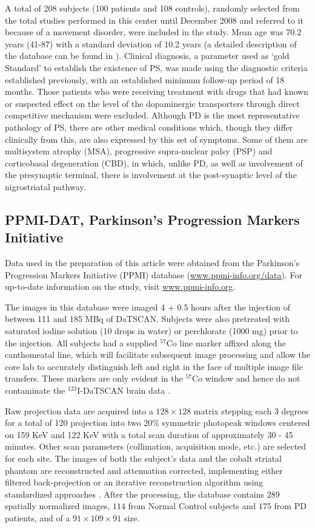 A total of 208 subjects (100 patients and 108 controls), randomly selected from the total studies performed in this center until December 2008 and referred to it because of a movement disorder, were included in the study. Mean age was 70.2 years (41-87) with a standard deviation of 10.2 years (a detailed description of the database can be found in \cite{Lozano2007}). Clinical diagnosis, a parameter used as `gold Standard' to establish the existence of PS, was made using the diagnostic criteria established previously, with an established minimum follow-up period of 18 months. Those patients who were receiving treatment with drugs that had known or suspected effect on the level of the dopaminergic transporters through direct competitive mechanism were excluded. Although PD is the most representative pathology of PS, there are other medical conditions which, though they differ clinically from this, are also expressed by this set of symptoms. Some of them are multisystem atrophy (MSA), progressive supra-nuclear palsy (PSP) and corticobasal degeneration (CBD), in which, unlike PD, as well as involvement of the presynaptic terminal, there is involvement at the post-synaptic level of the nigrostriatal pathway. 

\subsection{PPMI-DAT, Parkinson's Progression Markers Initiative}\label{sec:ppmi}
Data used in the preparation of this article were obtained from the Parkinson's Progression Markers Initiative (PPMI) database (\url{www.ppmi-info.org/data}). For up-to-date information on the study, visit \url{www.ppmi-info.org}.

The images in this database were imaged 4 + 0.5 hours after the injection of between 111 and 185 MBq of DaTSCAN. Subjects were also pretreated with saturated iodine solution (10 drops in water) or perchlorate (1000 mg) prior to the injection. All subjects had a supplied $^{57}$Co line marker affixed along the canthomeatal line, which will facilitate subsequent image processing and allow the core lab to accurately distinguish left and right in the face of multiple image file transfers. These markers are only evident in the $^{57}$Co window and hence do not contaminate the $^{123}$I-DaTSCAN brain data \cite{PPMI,Inititative2010}. 

Raw projection data are acquired into a $128 \times 128$ matrix stepping each 3 degrees for a total of 120 projection into two 20\% symmetric photopeak windows centered on 159 KeV and 122 KeV with a total scan duration of approximately 30 - 45 minutes. Other scan parameters (collimation, acquisition mode, etc.) are selected for each site. The images of both the subject's data and the cobalt striatal phantom are reconstructed and attenuation corrected, implementing either filtered back-projection or an iterative reconstruction algorithm using standardized approaches \cite{Inititative2010}. After the processing, the database contains $289$ spatially normalized images, $114$ from Normal Control subjects and $175$ from PD patients, and of a $91\times109\times91$ size. 